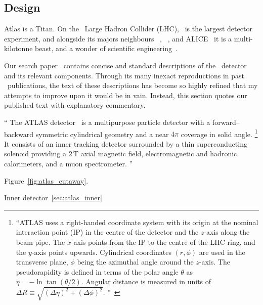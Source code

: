 
\subsection{Design}
Atlas is a Titan.
On the \cern\ Large Hadron Collider (LHC), \atlas\ is the largest detector
experiment, and alongside its majors neighbours
\cms~\cite{cms2008experiment},
\lhcb~\cite{lhcb2008experiment},
and ALICE~\cite{alice2008experiment}
it is a multi-kilotonne beast,
and a wonder of scientific engineering~\cite{
atlas2008experiment,
atlas1999design1,
atlas1999design2
}.


Our search paper~\cite{atlas2022searches} contains concise and standard
descriptions of the \atlas\ detector and its relevant components.
Through its many inexact reproductions in past \atlas\ publications, the text
of these descriptions has become so highly refined that my attempts to improve
upon it would be in vain.
Instead, this section quotes our published text with explanatory commentary.

\begin{displayquote}
``%
The ATLAS detector~\cite{PERF-2007-01} is a multipurpose particle detector with
a forward--backward symmetric cylindrical geometry and a near $4\pi$ coverage
in solid angle.%
\footnote{%
``ATLAS uses a right-handed coordinate system with its origin at the nominal
interaction point (IP) in the centre of the detector and the $z$-axis along the
beam pipe.
The $x$-axis points from the IP to the centre of the LHC ring, and the $y$-axis
points upwards.
Cylindrical coordinates $(r,\phi)$ are used in the transverse plane, $\phi$
being the azimuthal angle around the $z$-axis.
The pseudorapidity is defined in terms of the polar angle $\theta$ as
$\eta = -\ln \tan(\theta/2)$.
Angular distance is measured in units of
$\Delta R \equiv \sqrt{(\Delta\eta)^{2} + (\Delta\phi)^{2}}$.%
''~\cite{atlas2022searches}
}
It consists of an inner tracking detector surrounded by a thin superconducting
solenoid providing a $2\,\mathrm{T}$ axial magnetic field, electromagnetic and
hadronic calorimeters, and a muon spectrometer.%
''~\cite{atlas2022searches}
\end{displayquote}

Figure~\ref{fig:atlas_cutaway}.

Inner detector~\ref{sec:atlas_inner}

